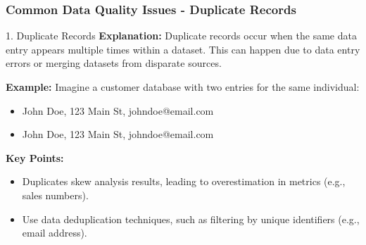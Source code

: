 \documentclass[aspectratio=169]{beamer}
\begin{document}
\begin{frame}[fragile]
    \frametitle{Common Data Quality Issues - Duplicate Records}
    \begin{block}{1. Duplicate Records}
        \textbf{Explanation:} 
        Duplicate records occur when the same data entry appears multiple times within a dataset. This can happen due to data entry errors or merging datasets from disparate sources.
        
        \textbf{Example:} 
        Imagine a customer database with two entries for the same individual:
        \begin{itemize}
            \item John Doe, 123 Main St, johndoe@email.com
            \item John Doe, 123 Main St, johndoe@email.com
        \end{itemize}

        \textbf{Key Points:}
        \begin{itemize}
            \item Duplicates skew analysis results, leading to overestimation in metrics (e.g., sales numbers).
            \item Use data deduplication techniques, such as filtering by unique identifiers (e.g., email address).
        \end{itemize}
    \end{block}
\end{frame}
\end{document}
